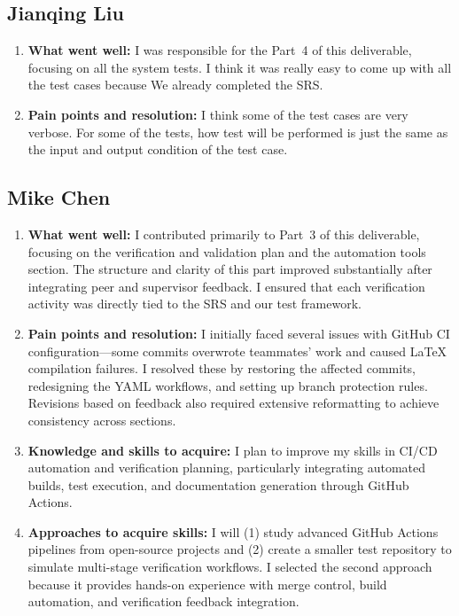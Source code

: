 \documentclass[12pt, titlepage]{article}
\begin{document}
\subsection*{Jianqing Liu}
\begin{enumerate}
  \item \textbf{What went well:}
        I was responsible for the Part~4 of this deliverable, focusing on all the system tests. I think it
        was really easy to come up with all the test cases because We already completed the SRS.

  \item \textbf{Pain points and resolution:}
        I think some of the test cases are very verbose. For some of the tests, how test will be performed
        is just the same as the input and output condition of the test case.
\end{enumerate}

\subsection*{Mike Chen}
\begin{enumerate}
  \item \textbf{What went well:}
        I contributed primarily to Part~3 of this deliverable, focusing on the verification and validation plan
        and the automation tools section. The structure and clarity of this part improved substantially after
        integrating peer and supervisor feedback. I ensured that each verification activity was directly tied
        to the SRS and our test framework.

  \item \textbf{Pain points and resolution:}
        I initially faced several issues with GitHub CI configuration—some commits overwrote teammates’
        work and caused LaTeX compilation failures. I resolved these by restoring the affected commits,
        redesigning the YAML workflows, and setting up branch protection rules. Revisions based on
        feedback also required extensive reformatting to achieve consistency across sections.

  \item \textbf{Knowledge and skills to acquire:}
        I plan to improve my skills in CI/CD automation and verification planning, particularly integrating
        automated builds, test execution, and documentation generation through GitHub Actions.

  \item \textbf{Approaches to acquire skills:}
        I will (1) study advanced GitHub Actions pipelines from open-source projects and (2) create a
        smaller test repository to simulate multi-stage verification workflows. I selected the second
        approach because it provides hands-on experience with merge control, build automation, and
        verification feedback integration.
\end{enumerate}
\end{document}
